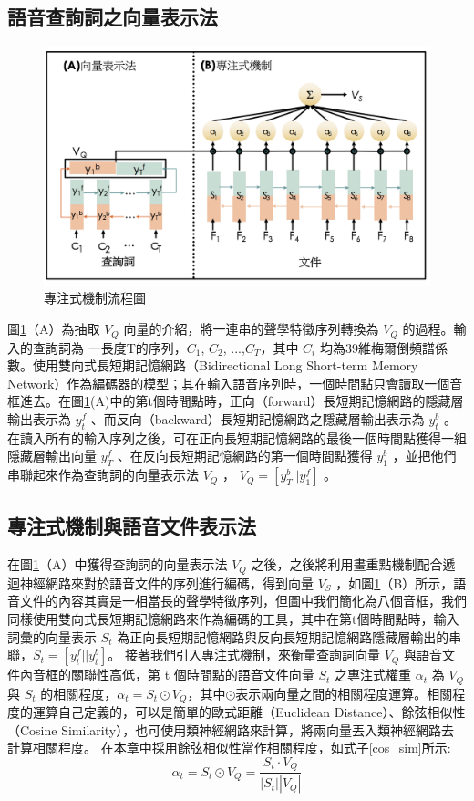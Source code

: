 \subsection{語音查詢詞之向量表示法}
\begin{figure}[h]
\centering
\includegraphics[scale=0.7]{images/ch4_att.png} 
\caption{專注式機制流程圖}
\label{ch4_att}
\end{figure}
\label{ch4_query_vec}
圖\ref{ch4_att}（A）為抽取 $V_Q$ 向量的介紹，將一連串的聲學特徵序列轉換為
$V_Q$ 的過程。輸入的查詢詞為
一長度T的序列，$C_1$, $C_2$,
...,$C_T$，其中 $C_i$ 均為39維梅爾倒頻譜係數。使用雙向式長短期記憶網路（Bidirectional
Long Short-term Memory
Network）作為編碼器的模型；其在輸入語音序列時，一個時間點只會讀取一個音框進去。在圖\ref{ch4_att}(A)中的第t個時間點時，正向（forward）長短期記憶網路的隱藏層輸出表示為
$y_t^f$ 、而反向（backward）長短期記憶網路之隱藏層輸出表示為 $y_{t}^b$
。在讀入所有的輸入序列之後，可在正向長短期記憶網路的最後一個時間點獲得一組隱藏層輸出向量
$y_{T}^f$ 、在反向長短期記憶網路的第一個時間點獲得 $y_{1}^b$
，並把他們串聯起來作為查詢詞的向量表示法 $V_Q$ ， $V_Q
= [y_T^b || y_1^f]$ 。
\subsection{專注式機制與語音文件表示法}
在圖\ref{ch4_att}（A）中獲得查詢詞的向量表示法 $V_Q$
之後，之後將利用畫重點機制配合遞迴神經網路來對於語音文件的序列進行編碼，得到向量
$V_S$
，如圖\ref{ch4_att}（B）所示，語音文件的內容其實是一相當長的聲學特徵序列，但圖中我們簡化為八個音框，我們同樣使用雙向式長短期記憶網路來作為編碼的工具，其中在第t個時間點時，輸入詞彙的向量表示
$S_t$ 為正向長短期記憶網路與反向長短期記憶網路隱藏層輸出的串聯，$S_t
= [ y_t^f || y_t^b ]$。
接著我們引入專注式機制，來衡量查詢詞向量 $V_Q$
與語音文件內音框的關聯性高低，第 t 個時間點的語音文件向量 $S_t$
之專注式權重 $\alpha_t$ 為 $V_Q$ 與 $S_t$ 的相關程度，$\alpha_t=
S_t \odot
V_Q$，其中$\odot$表示兩向量之間的相關程度運算。相關程度的運算自己定義的，可以是簡單的歐式距離（Euclidean
Distance）、餘弦相似性（Cosine Similarity），也可使用類神經網路來計算，將兩向量丟入類神經網路去計算相關程度。
在本章中採用餘弦相似性當作相關程度，如式子\ref{cos_sim}所示:
\begin{equation}
	\label{cos_sim}
	\alpha_t = S_t \odot V_Q = \frac{S_t \cdot V_Q}{|S_t||V_Q|}
\end{equation}

